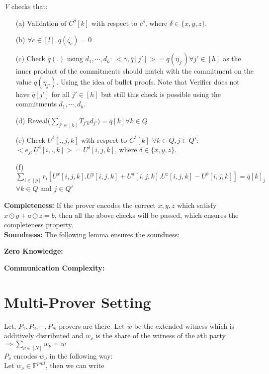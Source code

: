 \documentclass[runningheads]{llncs}
\begin{document}
\textit{V} checks that:
\begin{itemize}
	\item[(a)] Validation of $C^{\delta}[k]$ with respect to $c^{\delta}$, where $\delta\in\{x,y,z\}$. 
	\item[(b)] $\forall c\in[l], q(\zeta_c)=0$
	\item[(c)] Check $q(.)$ using $d_1,\cdots,d_h$: $<\gamma,\overline{q}[j']>=q(\eta_{j'})\forall j'\in[h]$ as the inner product of the commitments should match with the commitment on the value $q(\eta_{j'})$. Using the idea of bullet proofs. Note that Verifier does not have $\overline{q}[j'] $ for all $j'\in[h]$ but still this check is possible using the commitments $d_1,\cdots, d_h$.
	\item[(d)] Reveal($\sum\limits_{j'\in [h]} T_{j'k} d_{j'})=\overline{q}[k] \forall k\in Q$
	\item[(e)] Check $U^{\delta}[.,j,k]$ with respect to $C^{\delta}[k]$ $\forall k\in Q,  j\in Q'$: $<e_j,U^{\delta}[i,.,k]>=U^{\delta}[i,j,k]$, where $\delta\in\{x,y,z\}$. 
	\item[(f)] $\sum\limits_{i\in[p]} r_{i}[U^x[i,j,k].U^y[i,j,k]+U^a[i,j,k].U^z[i,j,k]-U^b[i,j,k]]=\overline{q}[k]_j$ $\forall k\in Q$ and $j\in Q'$\\
\end{itemize}

\textbf{Completeness:} If the prover encodes the correct $x,y,z$ which satisfy $x\odot y + a\odot z=b$, then all the above checks will be passed, which ensures the completeness property.\\

\textbf{Soundness:} The following lemma ensures the soundness:

\begin{lemma}
		
\end{lemma}

\textbf{Zero Knowledge:}

\textbf{Communication Complexity:}
\section{Multi-Prover Setting}

Let, $P_1,P_2,\cdots,P_N$ provers are there. Let $w$ be the extended witness which is additively distributed and $w_{\nu}$ is the share of the witness of the $\nu$th party $\Rightarrow \sum\limits_{\nu \in [N]}w_{\nu}=w$\\
$P_{\nu}$ encodes $w_{\nu}$ in the following way:\\
Let $w_{\nu}\in \mathbb{F}^{pml}$, then we can write 
\end{document}
